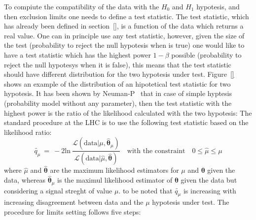 To compiute the compatibility of the data with the $H_{0}$ and $H_{1}$ hypotesis, and then exclusion limits 
one needs to define a test statistic. The test statistic, which has already been defined in section~\ref{},
is a function of the data which returns a real value. One can in principle use any test statistic, however, 
given the size of the test (probability to reject the null hypotesis when is true) one would like to have 
a test statistic which has the highest power $1 - \beta$ possible (probability to reject the 
null hypotesys when it is false), this means that the test statistic should have 
different distribution for the two hypotesis under test. Figure~\ref{} shows an example
of the distribution of an hipotetical test statistic for two hypotesis.
It has been shown by Neuman-P~\cite{} that in case of simple hyptesis (probability model without any parameter),
then the test statistic with the highest power is the ratio of the likelihood calculated with the two hypotesis:
The standard procedure at the LHC is to use the following test statistic \cite{} based on the likelihood ratio:
$$
\tilde{q_{\mu}} ~ = ~ -2 \text{ln} ~ \frac{\mathcal{L}(\text{data}|\mu, \hat{\boldsymbol{\theta}}_{\mu})}{\mathcal{L}(\text{data}|\hat{\mu}, \hat{\boldsymbol{\theta}})}
\quad \text{with the constraint} \quad 0 \leq \hat{\mu} \leq \mu
$$
 where $\hat{\mu}$ and $\hat{\boldsymbol{\theta}}$ are the maximum likelihood estimators for $\mu$ and $\boldsymbol{\theta}$ given the data, 
whereas $\hat{\boldsymbol{\theta}}_{\mu}$ is the maximul likelihood estimator of $\boldsymbol{\theta}$ given the data but considering
a signal streght of value $\mu$. to be noted that $\tilde{q_{\mu}}$ is increasing with increasing disagreement between data and the $\mu$ hypotesis under test.
The procedure for limits setting follows five steps:
